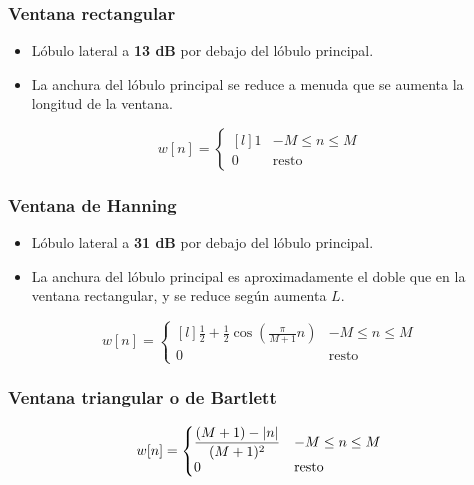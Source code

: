\documentclass[a4paper,oneside]{book}
\begin{document}
\begin{multicols}{2}
	\subsubsection{Ventana rectangular}\vspace{\parskip}
	\begin{itemize}
		\item Lóbulo lateral a \textbf{13 dB} por debajo del lóbulo principal.
		\item La anchura del lóbulo principal se reduce a menuda que se aumenta la longitud de la ventana.
	\end{itemize}
	\[ w[n] = \left\lbrace 
	\begin{matrix*}[l]
		1 & -M\leq n \leq M\\
		0 & \textrm{resto}
	\end{matrix*} \right. \]

	\subsubsection{Ventana de Hanning}\vspace{\parskip}
	\begin{itemize}
		\item Lóbulo lateral a \textbf{31 dB} por debajo del lóbulo principal.
		\item La anchura del lóbulo principal es aproximadamente el doble que en la ventana rectangular, y se reduce según aumenta $L$.
	\end{itemize}
	\[ w[n] = \left\lbrace
	\begin{matrix*}[l]
		\displaystyle{\frac{1}{2} + \frac{1}{2}\cos \left( \frac{\pi}{M+1}n \right)} & -M\leq n \leq M\\
		0 & \textrm{resto}
	\end{matrix*} \right. \]
	
\columnbreak	
	\subsubsection{Ventana triangular o de Bartlett}\vspace{\parskip}
	\[ w[n] = \left\lbrace
	\begin{matrix*}[l]
		\displaystyle{\frac{(M+1) - \abs{n}}{(M+1)^2}} & -M\leq n \leq M\\
		0 & \textrm{resto}
	\end{matrix*} \right. \]


\end{multicols}
\end{document}
